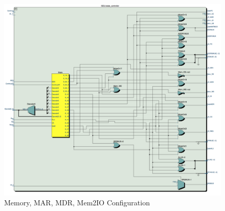 \documentclass[journal, twocolumn, final,11pt,letterpaper]{IEEEtran}
\begin{document}
\begin{figure} [htbp]
	\centering
	\includegraphics[scale=0.4]{ISDU_Circuit.png}
	\caption{Memory, MAR, MDR, Mem2IO Configuration\label{fig:ISDU-circuit}}
\end{figure}

\clearpage 
\end{document}
